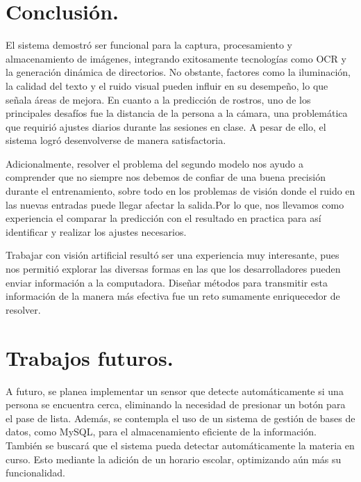\documentclass[12pt, letterpaper]{article}
\begin{document}
\section{Conclusión.}
El sistema demostró ser funcional para la captura, procesamiento y almacenamiento de imágenes, integrando exitosamente tecnologías como OCR y la generación dinámica de directorios. No obstante, factores como la iluminación, la calidad del texto y el ruido visual pueden influir en su desempeño, lo que señala áreas de mejora. En cuanto a la predicción de rostros, uno de los principales desafíos fue la distancia de la persona a la cámara, una problemática que requirió ajustes diarios durante las sesiones en clase. A pesar de ello, el sistema logró desenvolverse de manera satisfactoria.\par
Adicionalmente, resolver el problema del segundo modelo nos ayudo a comprender que no siempre nos debemos de confiar de una buena precisión durante el entrenamiento, sobre todo en los problemas de visión donde el ruido en las nuevas entradas puede llegar afectar la salida.Por lo que, nos llevamos como experiencia el comparar la predicción con el resultado en practica para así identificar y realizar los ajustes necesarios.\par 
Trabajar con visión artificial resultó ser una experiencia muy interesante, pues nos permitió explorar las diversas formas en las que los desarrolladores pueden enviar información a la computadora. Diseñar métodos para transmitir esta información de la manera más efectiva fue un reto sumamente enriquecedor de resolver.


\section{Trabajos futuros.}
A futuro, se planea implementar un sensor que detecte automáticamente si una persona se encuentra cerca, eliminando la necesidad de presionar un botón para el pase de lista. Además, se contempla el uso de un sistema de gestión de bases de datos, como MySQL, para el almacenamiento eficiente de la información. También se buscará que el sistema pueda detectar automáticamente la materia en curso. Esto mediante la adición de un horario escolar, optimizando aún más su funcionalidad.
\end{document}
